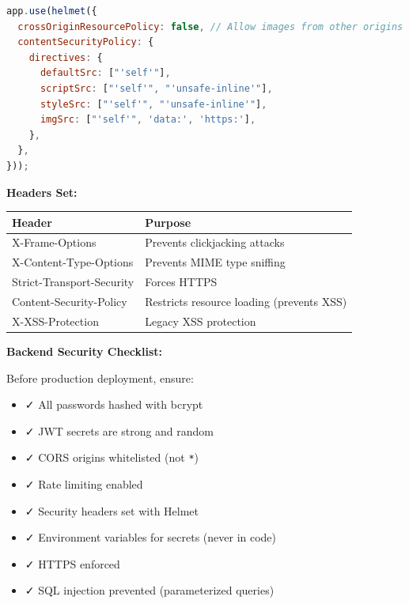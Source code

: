 \documentclass[12pt,a4paper,oneside]{article}
\begin{document}
\begin{lstlisting}[language=JavaScript, caption=Security Header Configuration]
app.use(helmet({
  crossOriginResourcePolicy: false, // Allow images from other origins
  contentSecurityPolicy: {
    directives: {
      defaultSrc: ["'self'"],
      scriptSrc: ["'self'", "'unsafe-inline'"],
      styleSrc: ["'self'", "'unsafe-inline'"],
      imgSrc: ["'self'", 'data:', 'https:'],
    },
  },
}));
\end{lstlisting}

\textbf{Headers Set:}

\begin{table}[H]
\centering
\small
\begin{tabular}{|p{3cm}|p{10cm}|}
\hline
\textbf{Header} & \textbf{Purpose} \\
\hline
X-Frame-Options & Prevents clickjacking attacks \\
\hline
X-Content-Type-Options & Prevents MIME type sniffing \\
\hline
Strict-Transport-Security & Forces HTTPS \\
\hline
Content-Security-Policy & Restricts resource loading (prevents XSS) \\
\hline
X-XSS-Protection & Legacy XSS protection \\
\hline
\end{tabular}
\end{table}

\begin{importantbox}
\textbf{Backend Security Checklist:}

Before production deployment, ensure:
\begin{itemize}
    \item ✓ All passwords hashed with bcrypt
    \item ✓ JWT secrets are strong and random
    \item ✓ CORS origins whitelisted (not \texttt{*})
    \item ✓ Rate limiting enabled
    \item ✓ Security headers set with Helmet
    \item ✓ Environment variables for secrets (never in code)
    \item ✓ HTTPS enforced
    \item ✓ SQL injection prevented (parameterized queries)
\end{itemize}
\end{importantbox}

\newpage
\end{document}
